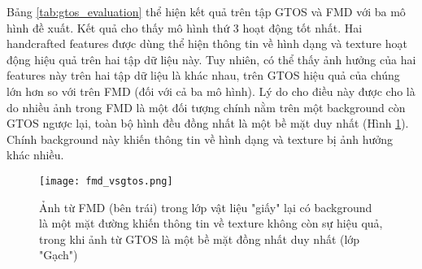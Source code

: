 \begin{table}[h!]
  \label{tab:fmd_evaluation}
  \begin{center}
  \captionsetup{width=0.9\textwidth}
  \caption{Kết quả thực nghiệm với các mô hình trên tập FMD}
  \end{center}
\end{table}

Bảng \ref{tab:gtos_evaluation} thể hiện kết quả trên tập GTOS và FMD với ba mô hình đề xuất. Kết quả cho thấy mô hình thứ 3 hoạt động tốt nhất. Hai handcrafted features được dùng thể hiện thông tin về hình dạng và texture hoạt động hiệu quả trên hai tập dữ liệu này. Tuy nhiên, có thể thấy ảnh hưởng của hai features này trên hai tập dữ liệu là khác nhau, trên GTOS hiệu quả của chúng lớn hơn so với trên FMD (đối với cả ba mô hình). Lý do cho điều này được cho là do nhiều ảnh trong FMD là một đối tượng chính nằm trên một background còn GTOS ngược lại, toàn bộ hình đều đồng nhất là một bề mặt duy nhất (Hình \ref{fig:fmd_vs_gtos}). Chính background này khiến thông tin về hình dạng và texture bị ảnh hưởng khác nhiều.

\begin{figure}[h!]
\centering
\captionsetup{width=0.9\textwidth}
\texttt{[image: fmd\_vsgtos.png]}
\caption{Ảnh từ FMD (bên trái) trong lớp vật liệu "giấy" lại có background là một mặt đường khiến thông tin về texture không còn sự hiệu quả, trong khi ảnh từ GTOS là một bề mặt đồng nhất duy nhất (lớp "Gạch")}
\label{fig:fmd_vs_gtos}
\end{figure}

